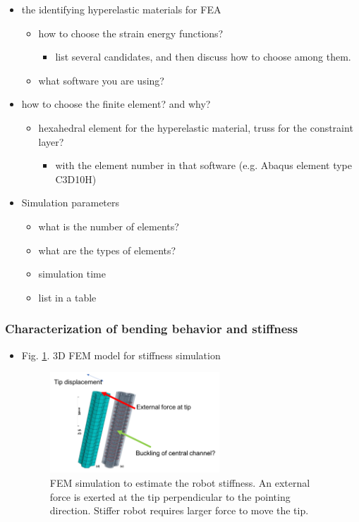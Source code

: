 \documentclass[journal,onecolumn]{IEEEtran}
\begin{document}
\begin{itemize}
\item the identifying hyperelastic materials for FEA
\begin{itemize}
\item how to choose the strain energy functions?
\begin{itemize}
\item list several candidates, and then discuss how to choose among them.
\end{itemize}
\item what software you are using?
\end{itemize}

\item how to choose the finite element? and why?
\begin{itemize}
\item hexahedral element for the hyperelastic material, truss for the constraint layer?
\begin{itemize}
\item with the element number in that software (e.g. Abaqus element type C3D10H)
\end{itemize}
\end{itemize}

\item Simulation parameters
\begin{itemize}
\item what is the number of elements?
\item what are the types of elements?
\item simulation time
\item list in a table
\end{itemize}
\end{itemize}


\subsubsection{Characterization of bending behavior and stiffness}
\label{sec:orge3e943e}

\begin{itemize}
\item Fig. \ref{fig:org62ae81e}. 3D FEM model for stiffness simulation

\begin{figure}[!h]
\centering
\includegraphics[width=0.6\textwidth]{./fig/fig-FEA_3D_external_tipforce.png}
\caption{\label{fig:org62ae81e}
FEM simulation to estimate the robot stiffness. An external force is exerted at the tip perpendicular to the pointing direction. Stiffer robot requires larger force to move the tip.}
\end{figure}
\end{itemize}
\end{document}
